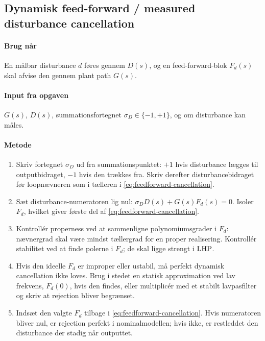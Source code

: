\subsection{Dynamisk feed-forward / measured disturbance cancellation}
\label{sec:feedforward}

\paragraph{Brug når}
En målbar disturbance \(d\) føres gennem \(D(s)\), og en feed-forward-blok \(F_d(s)\)
skal afvise den gennem plant path \(G(s)\).

\paragraph{Input fra opgaven}
\(G(s)\), \(D(s)\), summationsfortegnet \(\sigma_D\in\{-1,+1\}\), og om disturbance
kan måles.

\paragraph{Metode}
\begin{enumerate}
\item Skriv fortegnet \(\sigma_D\) ud fra summationspunktet: \(+1\) hvis disturbance
      lægges til outputbidraget, \(-1\) hvis den trækkes fra. Skriv derefter
      disturbancebidraget før loopnævneren som i tælleren i
      \eqref{eq:feedforward-cancellation}.
\item Sæt disturbance-numeratoren lig nul:
      \(\sigma_DD(s)+G(s)F_d(s)=0\). Isoler \(F_d\), hvilket giver første del af
      \eqref{eq:feedforward-cancellation}.
\item Kontrollér properness ved at sammenligne polynomiumsgrader i \(F_d\): nævnergrad
      skal være mindst tællergrad for en proper realisering. Kontrollér stabilitet ved
      at finde polerne i \(F_d\); de skal ligge strengt i \(\mathrm{LHP}\).
\item Hvis den ideelle \(F_d\) er improper eller ustabil, må perfekt dynamisk
      cancellation ikke loves. Brug i stedet en statisk approximation ved lav frekvens,
      \(F_d(0)\), hvis den findes, eller multiplicér med et stabilt lavpasfilter og
      skriv at rejection bliver begrænset.
\item Indsæt den valgte \(F_d\) tilbage i \eqref{eq:feedforward-cancellation}. Hvis
      numeratoren bliver nul, er rejection perfekt i nominalmodellen; hvis ikke, er
      restleddet den disturbance der stadig når outputtet.
\end{enumerate}

